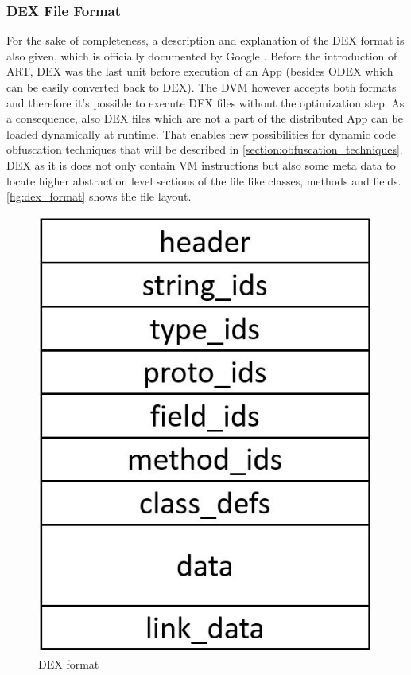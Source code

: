 \subsubsection{DEX File Format}
\label{section:dex_file_format}
For the sake of completeness, a description and explanation of the DEX format is also given,
which is officially documented by Google \parencite{dex}.
Before the introduction of ART, DEX was the last unit before
execution of an App (besides ODEX which can be easily converted back to DEX). The DVM however accepts both formats and therefore it's possible to execute
DEX files without the optimization step. As a consequence, also DEX files which are not a part of the distributed App can be loaded dynamically at runtime. That enables new possibilities for dynamic code obfuscation techniques that will be described in \autoref{section:obfuscation_techniques}.
DEX as it is does not only contain
VM instructions but also some meta data to locate
higher abstraction level sections of the file like classes,
methods and fields.
\autoref{fig:dex_format} shows the file layout.
\begin{figure}[htb]
  \centering
  \includegraphics[scale=0.3]{figures/dex_format}
  \caption[DEX format]{DEX format}
  \label{fig:dex_format}
\end{figure}
